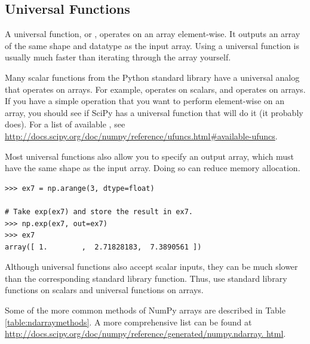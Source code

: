 \subsection*{Universal Functions} %

A universal function, or , operates on an array element-wise. 
It outputs an array of the same shape and datatype as the input array. 
Using a universal function is usually much faster than iterating through the array yourself.

Many scalar functions from the Python standard library have a universal analog that operates on arrays. 
For example,  operates on scalars, and  operates on arrays. 
If you have a simple operation that you want to perform element-wise on an array, you should see if SciPy has a universal function that will do it (it probably does). 
For a list of available , see \url{http://docs.scipy.org/doc/numpy/reference/ufuncs.html#available-ufuncs}.

Most universal functions also allow you to specify an output array, which must have the same shape as the input array.
Doing so can reduce memory allocation.


\begin{lstlisting}
>>> ex7 = np.arange(3, dtype=float)

# Take exp(ex7) and store the result in ex7.
>>> np.exp(ex7, out=ex7) 
>>> ex7
array([ 1.        ,  2.71828183,  7.3890561 ])
\end{lstlisting}

Although universal functions also accept scalar inputs, they can be much slower than the corresponding standard library function. 
Thus, use standard library functions on scalars and universal functions on arrays.

Some of the more common methods of NumPy arrays are described in Table \ref{table:ndarraymethods}. 
A more comprehensive list can be found at
\url{http://docs.scipy.org/doc/numpy/reference/generated/numpy.ndarray.
html}.

